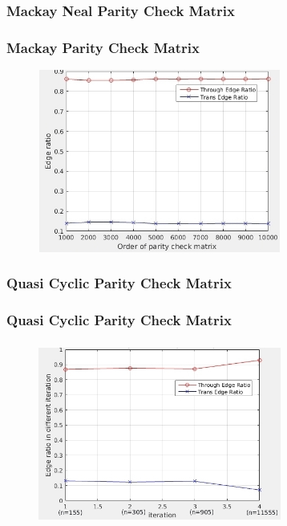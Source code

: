 \documentclass[xcolor=dvipsname]
{beamer}
\begin{document}
		\subsubsection{Mackay Neal Parity Check Matrix}
		\begin{frame}[t] 
			\frametitle{Mackay Parity Check Matrix}
			
			\begin{figure}
				\includegraphics[height=6cm,width=8cm]{mackey}
			\end{figure}
		\end{frame}
		
		\subsubsection{Quasi Cyclic Parity Check Matrix}
		\begin{frame}[t] 
			\frametitle{Quasi Cyclic Parity Check Matrix}
			\begin{figure}
				\includegraphics[height=6cm,width=8cm]{QC}
			\end{figure}
		\end{frame}


\end{document}
